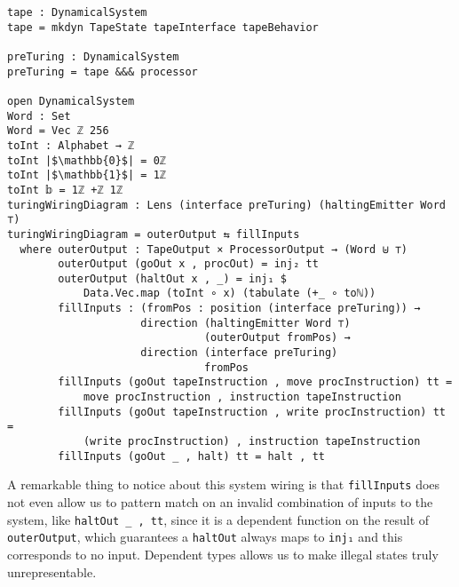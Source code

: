 \begin{verbatim}
tape : DynamicalSystem
tape = mkdyn TapeState tapeInterface tapeBehavior

preTuring : DynamicalSystem
preTuring = tape &&& processor

open DynamicalSystem
Word : Set
Word = Vec ℤ 256
toInt : Alphabet → ℤ
toInt |$\mathbb{0}$| = 0ℤ
toInt |$\mathbb{1}$| = 1ℤ
toInt 𝕓 = 1ℤ +ℤ 1ℤ
turingWiringDiagram : Lens (interface preTuring) (haltingEmitter Word ⊤)
turingWiringDiagram = outerOutput ⇆ fillInputs
  where outerOutput : TapeOutput × ProcessorOutput → (Word ⊎ ⊤)
        outerOutput (goOut x , procOut) = inj₂ tt
        outerOutput (haltOut x , _) = inj₁ $ 
            Data.Vec.map (toInt ∘ x) (tabulate (+_ ∘ toℕ))
        fillInputs : (fromPos : position (interface preTuring)) →
                     direction (haltingEmitter Word ⊤) 
                               (outerOutput fromPos) → 
                     direction (interface preTuring)
                               fromPos
        fillInputs (goOut tapeInstruction , move procInstruction) tt = 
            move procInstruction , instruction tapeInstruction
        fillInputs (goOut tapeInstruction , write procInstruction) tt = 
            (write procInstruction) , instruction tapeInstruction
        fillInputs (goOut _ , halt) tt = halt , tt

\end{verbatim}

A remarkable thing to notice about this system wiring is that \texttt{fillInputs} does not even allow us to pattern match on an invalid combination of inputs to the system, like \texttt{haltOut \_ , tt}, since it is a dependent function on the result of \texttt{outerOutput}, which guarantees a \texttt{haltOut} always maps to \texttt{inj₁} and this corresponds to no input. Dependent types allows us to make illegal states truly unrepresentable.

